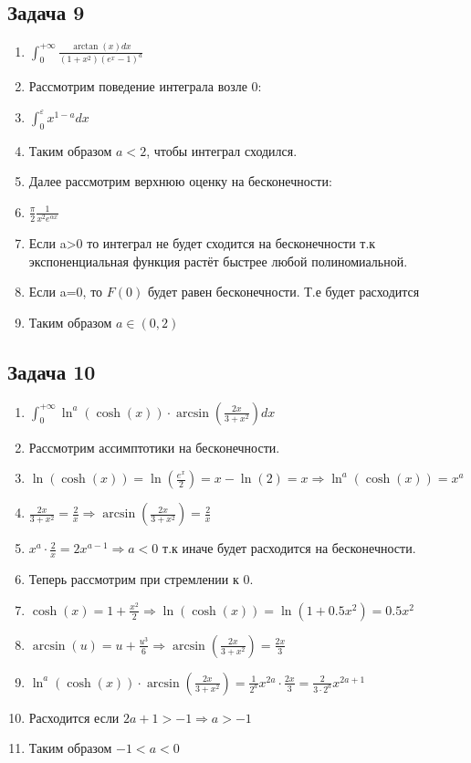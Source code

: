 \documentclass[a4paper,12pt]{article}
\begin{document}
\subsection{Задача 9}
\begin{enumerate}
    \item $\int_{0}^{+\infty}\frac{\arctan(x)dx}{(1+x^2)(e^x-1)^a}$
    \item Рассмотрим поведение интеграла возле 0:
    \item $\int_{0}^{\varepsilon} x^{1-a}dx$
    \item Таким образом $a < 2$, чтобы интеграл сходился.
    \item Далее рассмотрим верхнюю оценку на бесконечности:
    \item $\frac{\pi}{2} \frac{1}{x^2 e^{\alpha x}} $
    \item Если a>0 то интеграл не будет сходится на бесконечности т.к экспоненциальная функция растёт быстрее любой полиномиальной.
    \item Если a=0, то $F(0)$ будет равен бесконечности. Т.е будет расходится
    \item Таким образом $a \in (0, 2)$
\end{enumerate}

\subsection{Задача 10}
\begin{enumerate}
    \item $\int_{0}^{+\infty} \ln^a(\cosh(x))\cdot \arcsin(\frac{2x}{3+x^2})dx$
    \item Рассмотрим ассимптотики на бесконечности.
    \item $\ln(\cosh(x)) = \ln(\frac{e^x}{2}) = x-\ln(2)=x \Rightarrow \ln^a(\cosh(x))=x^a$
    \item $\frac{2x}{3+x^2} = \frac{2}{x} \Rightarrow \arcsin(\frac{2x}{3+x^2}) = \frac{2}{x}$
    \item $x^a\cdot \frac{2}{x} = 2x^{a-1} \Rightarrow a < 0$ т.к иначе будет расходится на бесконечности. 
    \item Теперь рассмотрим при стремлении к 0.
    \item $\cosh(x) = 1+\frac{x^2}{2} \Rightarrow \ln(\cosh(x)) = \ln(1+0.5x^2) = 0.5x^2$
    \item $\arcsin(u)=u+\frac{u^3}{6} \Rightarrow \arcsin(\frac{2x}{3+x^2})=\frac{2x}{3}$
    \item $\ln^a(\cosh(x))\cdot \arcsin(\frac{2x}{3+x^2})=\frac{1}{2^a}x^{2a}\cdot\frac{2x}{3}=\frac{2}{3\cdot2^a}x^{2a+1}$
    \item Расходится если $2a+1>-1 \Rightarrow a > -1$
    \item Таким образом $-1 < a < 0$
\end{enumerate}
\end{document}
